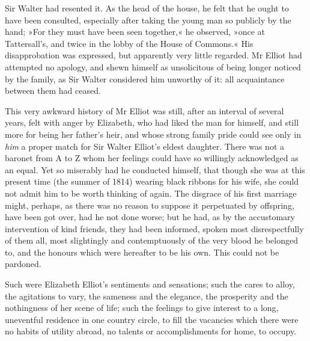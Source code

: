 Sir Walter had resented it. As the head of the house, he felt that he ought to have been consulted, especially after taking the young man so publicly by the hand; »For they must have been seen together,« he observed, »once at Tattersall's, and twice in the lobby of the House of Commons.« His disapprobation was expressed, but apparently very little regarded. Mr Elliot had attempted no apology, and shewn himself as unsolicitous of being longer noticed by the family, as Sir Walter considered him unworthy of it: all acquaintance between them had ceased.

This very awkward history of Mr Elliot was still, after an interval of several years, felt with anger by Elizabeth, who had liked the man for himself, and still more for being her father's heir, and whose strong family pride could see only in \textit{him} a proper match for Sir Walter Elliot's eldest daughter. There was not a baronet from A to Z whom her feelings could have so willingly acknowledged as an equal. Yet so miserably had he conducted himself, that though she was at this present time (the summer of 1814) wearing black ribbons for his wife, she could not admit him to be worth thinking of again. The disgrace of his first marriage might, perhaps, as there was no reason to suppose it perpetuated by offspring, have been got over, had he not done worse; but he had, as by the accustomary intervention of kind friends, they had been informed, spoken most disrespectfully of them all, most slightingly and contemptuously of the very blood he belonged to, and the honours which were hereafter to be his own. This could not be pardoned.

Such were Elizabeth Elliot's sentiments and sensations; such the cares to alloy, the agitations to vary, the sameness and the elegance, the prosperity and the nothingness of her scene of life; such the feelings to give interest to a long, uneventful residence in one country circle, to fill the vacancies which there were no habits of utility abroad, no talents or accomplishments for home, to occupy.

